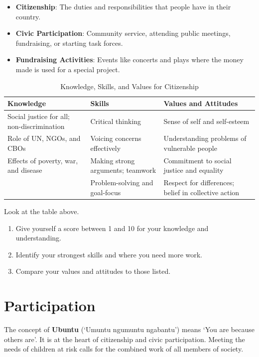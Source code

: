 \documentclass[12pt,a4paper]{article}
\begin{document}
\begin{itemize}
    \item \textbf{Citizenship}: The duties and responsibilities that people have in their country.
    \item \textbf{Civic Participation}: Community service, attending public meetings, fundraising, or starting task forces.
    \item \textbf{Fundraising Activities}: Events like concerts and plays where the money made is used for a special project.
\end{itemize}

\begin{table}[h!]
    \centering
    \caption{Knowledge, Skills, and Values for Citizenship}
    \begin{tabular}{|p{4.5cm}|p{4.5cm}|p{4.5cm}|}
        \hline
        \textbf{Knowledge} & \textbf{Skills} & \textbf{Values and Attitudes} \\ \hline
        Social justice for all; non-discrimination & Critical thinking & Sense of self and self-esteem \\ \hline
        Role of UN, NGOs, and CBOs & Voicing concerns effectively & Understanding problems of vulnerable people \\ \hline
        Effects of poverty, war, and disease & Making strong arguments; teamwork & Commitment to social justice and equality \\ \hline
        & Problem-solving and goal-focus & Respect for differences; belief in collective action \\ \hline
    \end{tabular}
\end{table}

\begin{tcolorbox}[colback=green!5,colframe=green!75!black,title=Learning Activity 4.2: Rate Your Own Citizenship!]
Look at the table above. 
\begin{enumerate}
    \item Give yourself a score between 1 and 10 for your knowledge and understanding.
    \item Identify your strongest skills and where you need more work.
    \item Compare your values and attitudes to those listed.
\end{enumerate}
\end{tcolorbox}

\section*{Participation}
The concept of \textbf{Ubuntu} (‘Umuntu ngumuntu ngabantu’) means ‘You are because others are’. It is at the heart of citizenship and civic participation. Meeting the needs of children at risk calls for the combined work of all members of society.
\end{document}
